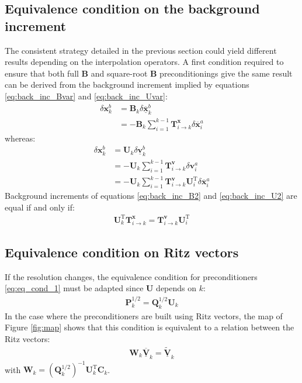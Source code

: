 \documentclass[12pt]{scrartcl}
\begin{document}
\subsection{Equivalence condition on the background increment}
The consistent strategy detailed in the previous section could yield different results depending on the interpolation operators. A first condition required to ensure that both full $\mathbf{B}$ and square-root $\mathbf{B}$ preconditionings give the same result can be derived from the background increment implied by equations \eqref{eq:back_inc_Bvar} and \eqref{eq:back_inc_Uvar}:
\begin{align}
\label{eq:back_inc_B2}
\delta \mathbf{x}^b_k & = \mathbf{B}_k \delta \underline{\overline{\mathbf{x}}}^b_k \nonumber \\
 & = - \mathbf{B}_k \sum_{i=1}^{k-1} \mathbf{T}^\mathbf{x}_{i \rightarrow k} \delta \overline{\mathbf{x}}^a_i
\end{align}
whereas:
\begin{align}
\label{eq:back_inc_U2}
\delta \mathbf{x}^b_k & = \mathbf{U}_k \delta \underline{\mathbf{v}}^b_k \nonumber \\
 & = -\mathbf{U}_k \sum_{i=1}^{k-1} \mathbf{T}^\mathbf{v}_{i \rightarrow k} \delta \mathbf{v}^a_i \nonumber \\
 & = -\mathbf{U}_k \sum_{i=1}^{k-1} \mathbf{T}^\mathbf{v}_{i \rightarrow k} \mathbf{U}_i^\mathrm{T} \delta \overline{\mathbf{x}}^a_i
\end{align}
Background increments of equations \eqref{eq:back_inc_B2} and \eqref{eq:back_inc_U2} are equal if and only if:
\begin{align}
\label{eq:eq_cond_2}
\mathbf{U}_k^\mathrm{T} \mathbf{T}^\mathbf{x}_{i \rightarrow k} = \mathbf{T}^\mathbf{v}_{i \rightarrow k} \mathbf{U}_i^\mathrm{T}
\end{align}

\subsection{Equivalence condition on Ritz vectors}
If the resolution changes, the equivalence condition for preconditioners \eqref{eq:eq_cond_1} must be adapted since $\mathbf{U}$ depends on $k$:
\begin{align}
\mathbf{P}^{1/2}_k = \mathbf{Q}^{1/2}_k \mathbf{U}_k
\end{align}
In the case where the preconditioners are built using Ritz vectors, the map of Figure \ref{fig:map} shows that this condition is equivalent to a relation between the Ritz vectors:
\begin{align}
\mathbf{W}_k\underline{\overline{\mathbf{V}}}_k = \underline{\widetilde{\mathbf{V}}}_k
\end{align}
with $\mathbf{W}_k = \left(\mathbf{Q}^{1/2}_k\right)^{-1} \mathbf{U}^\mathrm{T}_k \mathbf{C}_k$.\\
\end{document}
